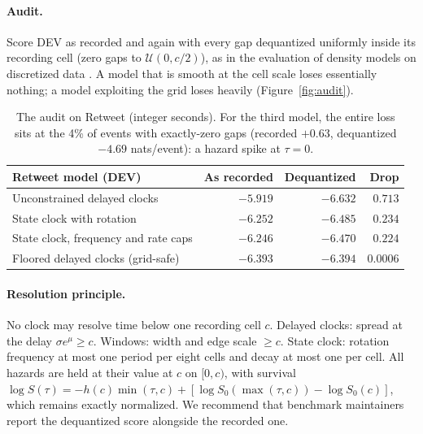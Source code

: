 \documentclass[11pt]{article}
\begin{document}
\paragraph{Audit.} Score DEV as recorded and again with every gap dequantized uniformly inside its recording cell (zero gaps to $\mathcal{U}(0,c/2)$), as in the evaluation of density models on discretized data \citep{theis2016note}. A model that is smooth at the cell scale loses essentially nothing; a model exploiting the grid loses heavily (Figure~\ref{fig:audit}).

\begin{table}[h]
\centering\small
\begin{tabular}{@{}lrrr@{}}
\toprule
Retweet model (DEV) & As recorded & Dequantized & Drop \\
\midrule
Unconstrained delayed clocks & $-5.919$ & $-6.632$ & $0.713$ \\
State clock with rotation & $-6.252$ & $-6.485$ & $0.234$ \\
State clock, frequency and rate caps & $-6.246$ & $-6.470$ & $0.224$ \\
Floored delayed clocks (grid-safe) & $-6.393$ & $-6.394$ & $0.0006$ \\
\bottomrule
\end{tabular}
\caption{The audit on Retweet (integer seconds). For the third model, the entire loss sits at the 4\% of events with exactly-zero gaps (recorded $+0.63$, dequantized $-4.69$ nats/event): a hazard spike at $\tau=0$.}
\label{tab:audit}
\end{table}

\paragraph{Resolution principle.} No clock may resolve time below one recording cell $c$. Delayed clocks: spread at the delay $\sigma e^{\mu}\ge c$. Windows: width and edge scale $\ge c$. State clock: rotation frequency at most one period per eight cells and decay at most one per cell. All hazards are held at their value at $c$ on $[0,c)$, with survival $\log S(\tau)=-h(c)\min(\tau,c)+[\log S_0(\max(\tau,c))-\log S_0(c)]$, which remains exactly normalized. We recommend that benchmark maintainers report the dequantized score alongside the recorded one.
\end{document}
